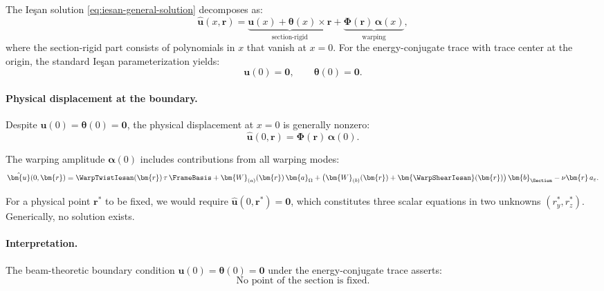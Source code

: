The Ieşan solution \eqref{eq:iesan-general-solution} decomposes as:
\begin{equation}
\hat{\bm{u}}(x, \bm{r}) = \underbrace{\bm{u}(x) + \bm{\theta}(x) \times \bm{r}}_{\text{section-rigid}} 
+ \underbrace{\bm{\Phi}(\bm{r})\,\bm{\alpha}(x)}_{\text{warping}},
\end{equation}
where the section-rigid part consists of polynomials in $x$ that vanish at 
$x = 0$. For the energy-conjugate trace with trace center at the origin, 
the standard Ieşan parameterization yields:
\begin{equation}
\bm{u}(0) = \mathbf{0}, \qquad \bm{\theta}(0) = \mathbf{0}.
\end{equation}

\paragraph{Physical displacement at the boundary.}

Despite $\bm{u}(0) = \bm{\theta}(0) = \mathbf{0}$, the physical displacement 
at $x = 0$ is generally nonzero:
\begin{equation}
\hat{\bm{u}}(0, \bm{r}) = \bm{\Phi}(\bm{r})\,\bm{\alpha}(0).
\end{equation}

The warping amplitude $\bm{\alpha}(0)$ includes contributions from all 
warping modes:
\begin{equation}
\hat{\bm{u}}(0, \bm{r}) = \WarpTwistIesan(\bm{r})\,\tau\,\FrameBasis 
+ \bm{W}_{(a)}(\bm{r})\,\bm{a}_\Omega 
+ \big(\bm{W}_{(b)}(\bm{r}) + \bm{\WarpShearIesan}(\bm{r})\big)\,\bm{b}_{\Section}
- \nu\bm{r}\,a_\varepsilon.
\end{equation}

For a physical point $\bm{r}^*$ to be fixed, we would require 
$\hat{\bm{u}}(0, \bm{r}^*) = \mathbf{0}$, which constitutes three scalar 
equations in two unknowns $(r_y^*, r_z^*)$. Generically, no solution exists.

\paragraph{Interpretation.}

The beam-theoretic boundary condition $\bm{u}(0) = \bm{\theta}(0) = \mathbf{0}$ 
under the energy-conjugate trace asserts:
\begin{equation}
\boxed{\text{No point of the section is fixed.}}
\end{equation}

